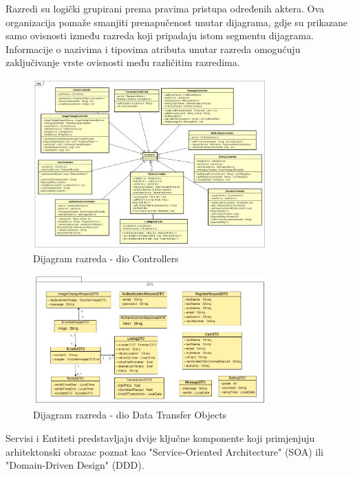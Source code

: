 			\indent Razredi su logički grupirani prema pravima pristupa određenih aktera. Ova organizacija pomaže smanjiti prenapučenost unutar dijagrama, gdje su prikazane samo ovisnosti između razreda koji pripadaju istom segmentu dijagrama. Informacije o nazivima i tipovima atributa unutar razreda omogućuju zaključivanje vrste ovisnosti među različitim razredima. \\
		
			\begin{figure}[H]
				\centering
				\includegraphics[width=0.8\textwidth]{dijagrami/ControllersDiagram.png}
				\caption{Dijagram razreda - dio Controllers}
				\label{fig:your_label}
			\end{figure}
			
			\begin{figure}[H]
				\centering
				\includegraphics[width=0.8\textwidth]{dijagrami/DTO_dijagram.png}
				\caption{Dijagram razreda - dio Data Transfer Objects}
				\label{fig:your_label}
			\end{figure}
			
			\indent Servisi i Entiteti predstavljaju dvije ključne komponente koji primjenjuju arhitektonski obrazac poznat kao "Service-Oriented Architecture" (SOA) ili "Domain-Driven Design" (DDD). \\
			
